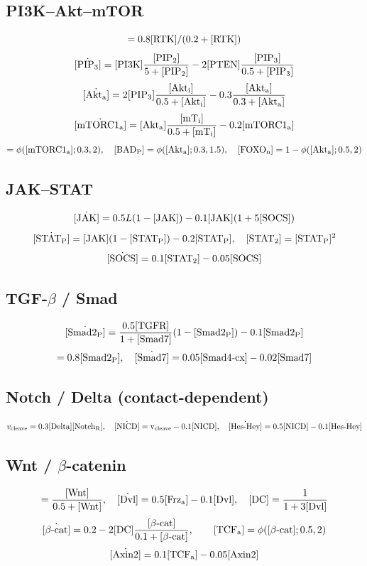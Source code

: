 \documentclass[11pt,a4paper]{article}
\newcommand{\eq}[1]{\begin{equation}#1\end{equation}}
\begin{document}
\subsection{PI3K--Akt--mTOR}
\eq{ [\rm PI3K]=0.8[\rm RTK]/(0.2+[\rm RTK]) }
\eq{ \dot{[\rm PIP_3]}=[\rm PI3K]\frac{[\rm PIP_2]}{5+[\rm PIP_2]} - 2[\rm PTEN]\frac{[\rm PIP_3]}{0.5+[\rm PIP_3]} }
\eq{ \dot{[\rm Akt_a]}=2[\rm PIP_3]\frac{[\rm Akt_i]}{0.5+[\rm Akt_i]} - 0.3\frac{[\rm Akt_a]}{0.3+[\rm Akt_a]} }
\eq{ \dot{[\rm mTORC1_a]}=[\rm Akt_a]\frac{[\rm mT_i]}{0.5+[\rm mT_i]} - 0.2[\rm mTORC1_a] }
\eq{ [\rm S6K_a]=\phi([\rm mTORC1_a];0.3,2),\quad [\rm BAD_P]=\phi([\rm Akt_a];0.3,1.5),\quad [\rm FOXO_n]=1-\phi([\rm Akt_a];0.5,2) }

\subsection{JAK--STAT}
\eq{ \dot{[\rm JAK]}=0.5 L(1-[\rm JAK]) - 0.1[\rm JAK](1+5[\rm SOCS]) }
\eq{ \dot{[\rm STAT_P]}=[\rm JAK](1-[\rm STAT_P])-0.2[\rm STAT_P],\quad [\rm STAT_2]=[\rm STAT_P]^2 }
\eq{ \dot{[\rm SOCS]}=0.1[\rm STAT_2]-0.05[\rm SOCS] }

\subsection{TGF-$\beta$ / Smad}
\eq{ \dot{[\rm Smad2_P]}=\frac{0.5[\rm TGFR]}{1+[\rm Smad7]}(1-[\rm Smad2_P])-0.1[\rm Smad2_P] }
\eq{ [\rm Smad4\text{-}complex]=0.8[\rm Smad2_P],\quad \dot{[\rm Smad7]}=0.05[\rm Smad4\text{-}cx]-0.02[\rm Smad7] }

\subsection{Notch / Delta (contact-dependent)}
\eq{ v_{\rm cleave}=0.3[\rm Delta][\rm Notch_R],\quad \dot{[\rm NICD]}=v_{\rm cleave}-0.1[\rm NICD],\quad \dot{[\rm Hes\text{-}Hey]}=0.5[\rm NICD]-0.1[\rm Hes\text{-}Hey] }

\subsection{Wnt / $\beta$-catenin}
\eq{ [\rm Frz_a]=\frac{[\rm Wnt]}{0.5+[\rm Wnt]},\quad \dot{[\rm Dvl]}=0.5[\rm Frz_a]-0.1[\rm Dvl],\quad [\rm DC]=\frac{1}{1+3[\rm Dvl]} }
\eq{ \dot{[\beta\text{-cat}]}=0.2-2[\rm DC]\frac{[\beta\text{-cat}]}{0.1+[\beta\text{-cat}]},\qquad [\rm TCF_a]=\phi([\beta\text{-cat}];0.5,2) }
\eq{ \dot{[\rm Axin2]}=0.1[\rm TCF_a]-0.05[\rm Axin2] }
\end{document}
